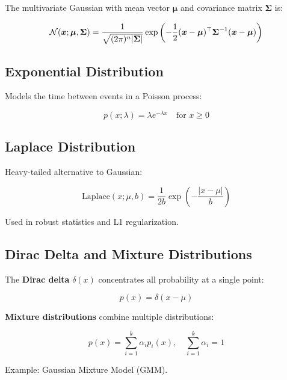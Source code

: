 The multivariate Gaussian with mean vector $\boldsymbol{\mu}$ and covariance matrix $\boldsymbol{\Sigma}$ is:

\begin{equation}
\mathcal{N}(\boldsymbol{x}; \boldsymbol{\mu}, \boldsymbol{\Sigma}) = \frac{1}{\sqrt{(2\pi)^n |\boldsymbol{\Sigma}|}} \exp\left(-\frac{1}{2}(\boldsymbol{x}-\boldsymbol{\mu})^\top \boldsymbol{\Sigma}^{-1} (\boldsymbol{x}-\boldsymbol{\mu})\right)
\end{equation}

\subsection{Exponential Distribution}

Models the time between events in a Poisson process:

\begin{equation}
p(x; \lambda) = \lambda e^{-\lambda x} \quad \text{for } x \geq 0
\end{equation}

\subsection{Laplace Distribution}

Heavy-tailed alternative to Gaussian:

\begin{equation}
\text{Laplace}(x; \mu, b) = \frac{1}{2b} \exp\left(-\frac{|x-\mu|}{b}\right)
\end{equation}

Used in robust statistics and L1 regularization.

\subsection{Dirac Delta and Mixture Distributions}

The \textbf{Dirac delta} $\delta(x)$ concentrates all probability at a single point:

\begin{equation}
p(x) = \delta(x - \mu)
\end{equation}

\textbf{Mixture distributions} combine multiple distributions:

\begin{equation}
p(x) = \sum_{i=1}^{k} \alpha_i p_i(x), \quad \sum_{i=1}^{k} \alpha_i = 1
\end{equation}

Example: Gaussian Mixture Model (GMM).
